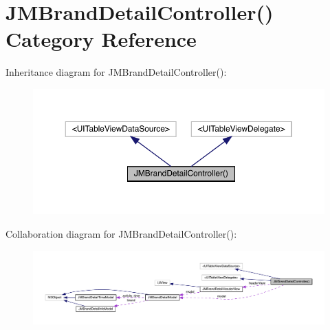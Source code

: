 \hypertarget{category_j_m_brand_detail_controller_07_08}{}\section{J\+M\+Brand\+Detail\+Controller() Category Reference}
\label{category_j_m_brand_detail_controller_07_08}


Inheritance diagram for J\+M\+Brand\+Detail\+Controller()\+:\nopagebreak
\begin{figure}[H]
\begin{center}
\leavevmode
\includegraphics[width=350pt]{category_j_m_brand_detail_controller_07_08__inherit__graph}
\end{center}
\end{figure}


Collaboration diagram for J\+M\+Brand\+Detail\+Controller()\+:\nopagebreak
\begin{figure}[H]
\begin{center}
\leavevmode
\includegraphics[width=350pt]{category_j_m_brand_detail_controller_07_08__coll__graph}
\end{center}
\end{figure}
